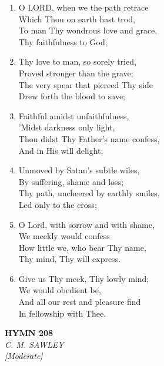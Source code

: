 \begin{enumerate}
    \item O LORD, when we the path retrace \\
        Which Thou on earth hast trod, \\
        To man Thy wondrous love and grace, \\
        Thy faithfulness to God;

    \item Thy love to man, so sorely tried, \\
        Proved stronger than the grave; \\
        The very spear that pierced Thy side \\
        Drew forth the blood to save;

    \item Faithful amidst unfaithfulness, \\
        'Midst darkness only light, \\
        Thou didst Thy Father's name confess, \\
        And in His will delight;

    \item Unmoved by Satan's subtle wiles, \\
        By suffering, shame and loss; \\
        Thy path, uncheered by earthly smiles, \\
        Led only to the cross;

    \item O Lord, with sorrow and with shame, \\
        We meekly would confess \\
        How little we, who bear Thy name, \\
        Thy mind, Thy will express.

    \item Give us Thy meek, Thy lowly mind; \\
        We would obedient be, \\
        And all our rest and pleasure find \\
        In fellowship with Thee.

\end{enumerate}

\newpage
\begin{center}
    {\Large \textbf{HYMN 208}}
    \\
    \textit{C. M. SAWLEY}
    \\
    \textit{\small [Moderate]}
\end{center}
\vspace{1em}

